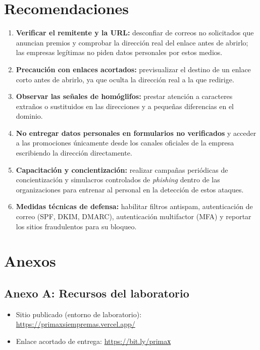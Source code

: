 \documentclass[12pt,a4paper]{article}
\begin{document}
\section{Recomendaciones}

\begin{enumerate}[leftmargin=1.5cm]
  \item \textbf{Verificar el remitente y la URL:} desconfiar de correos no solicitados que anuncian premios y comprobar la dirección real del enlace antes de abrirlo; las empresas legítimas no piden datos personales por estos medios.
  \item \textbf{Precaución con enlaces acortados:} previsualizar el destino de un enlace corto antes de abrirlo, ya que oculta la dirección real a la que redirige.
  \item \textbf{Observar las señales de homóglifos:} prestar atención a caracteres extraños o sustituidos en las direcciones y a pequeñas diferencias en el dominio.
  \item \textbf{No entregar datos personales en formularios no verificados} y acceder a las promociones únicamente desde los canales oficiales de la empresa escribiendo la dirección directamente.
  \item \textbf{Capacitación y concientización:} realizar campañas periódicas de concientización y simulacros controlados de \textit{phishing} dentro de las organizaciones para entrenar al personal en la detección de estos ataques.
  \item \textbf{Medidas técnicas de defensa:} habilitar filtros antispam, autenticación de correo (SPF, DKIM, DMARC), autenticación multifactor (MFA) y reportar los sitios fraudulentos para su bloqueo.
\end{enumerate}

\section*{Anexos}

\subsection*{Anexo A: Recursos del laboratorio}

\begin{itemize}[leftmargin=1.5cm]
  \item Sitio publicado (entorno de laboratorio): \url{https://primaxsiempremas.vercel.app/}
  \item Enlace acortado de entrega: \url{https://bit.ly/primaх}
\end{itemize}
\end{document}
